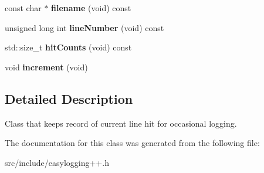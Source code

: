 \begin{DoxyCompactItemize}
const char $\ast$ {\bfseries filename} (void) const
\item 
\mbox{\label{classel_1_1base_1_1_hit_counter_ad91321587b8aef0a257009abc54a2aea}} 
unsigned long int {\bfseries line\+Number} (void) const
\item 
\mbox{\label{classel_1_1base_1_1_hit_counter_ac2b3af741dc18e7839f4211af26a2887}} 
std\+::size\+\_\+t {\bfseries hit\+Counts} (void) const
\item 
\mbox{\label{classel_1_1base_1_1_hit_counter_ae2d7709a89362019195761416d510911}} 
void {\bfseries increment} (void)
\end{DoxyCompactItemize}


\subsection{Detailed Description}
Class that keeps record of current line hit for occasional logging. 

The documentation for this class was generated from the following file\+:\begin{DoxyCompactItemize}
\item 
src/include/easylogging++.\+h\end{DoxyCompactItemize}
